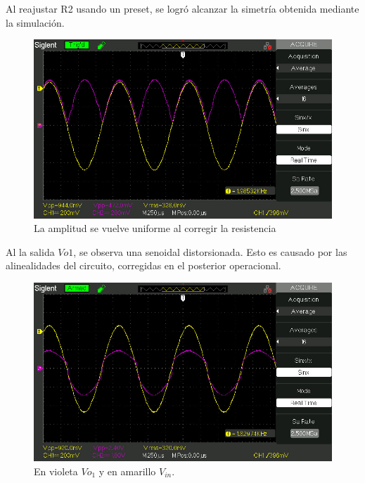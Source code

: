 Al reajustar R2 usando un preset, se logró alcanzar la simetría obtenida mediante la simulación.

\begin{figure}[H]
    \centering
    \includegraphics[width=0.75\linewidth]{Secciones//Circuito3/osc3_2.jpg}
    \caption{La amplitud se vuelve uniforme al corregir la resistencia}
    \label{fig:enter-label}
\end{figure}

Al la salida $Vo1$, se observa una senoidal distorsionada. Esto es causado por las alinealidades del circuito, corregidas en el posterior operacional.

\begin{figure}[H]
    \centering
    \includegraphics[width=0.75\linewidth]{Secciones//Circuito3/osc3_3.jpg}
    \caption{En violeta $Vo_1$ y en amarillo $V_{in}$.}
    \label{fig:enter-label}
\end{figure}






